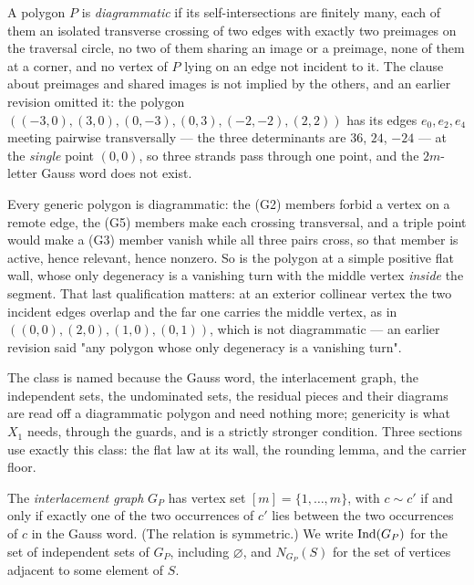 \begin{definition}\label{def:diagrammatic}
A polygon $P$ is \emph{diagrammatic} if its self-intersections are finitely
many, each of them an isolated transverse crossing of two edges with exactly two
preimages on the traversal circle, no two of them sharing an image or a
preimage, none of them at a corner, and no vertex of $P$ lying on an edge not
incident to it. The clause about preimages and shared images is not implied by
the others, and an earlier revision omitted it: the polygon
$((-3,0),(3,0),(0,-3),(0,3),(-2,-2),(2,2))$ has its edges $e_0,e_2,e_4$ meeting
pairwise transversally --- the three determinants are $36$, $24$, $-24$ --- at
the \emph{single} point $(0,0)$, so three strands pass through one point, and the
$2m$-letter Gauss word does not exist.

Every generic polygon is diagrammatic: the (G2) members forbid a vertex on a
remote edge, the (G5) members make each crossing transversal, and a triple point
would make a (G3) member vanish while all three pairs cross, so that member is
active, hence relevant, hence nonzero. So is the polygon at a simple positive
flat wall, whose only degeneracy is a vanishing turn with the middle vertex
\emph{inside} the segment. That last qualification matters: at an exterior
collinear vertex the two incident edges overlap and the far one carries the
middle vertex, as in $((0,0),(2,0),(1,0),(0,1))$, which is not diagrammatic ---
an earlier revision said "any polygon whose only degeneracy is a vanishing
turn".

The class is named because the Gauss word, the interlacement graph, the
independent sets, the undominated sets, the residual pieces and their diagrams
are read off a diagrammatic polygon and need nothing more; genericity is what
$X_1$ needs, through the guards, and is a strictly stronger condition. Three
sections use exactly this class: the flat law at its wall, the rounding lemma,
and the carrier floor.
\end{definition}

\begin{definition}\label{def:interlace}
The \emph{interlacement graph} $G_P$ has vertex set $[m]=\{1,\dots,m\}$, with
$c\sim c'$ if and only if exactly one of the two occurrences of $c'$ lies between
the two occurrences of $c$ in the Gauss word. (The relation is symmetric.) We
write $\operatorname{Ind}(G_P)$ for the set of independent sets of $G_P$, including
$\varnothing$, and $N_{G_P}(S)$ for the set of vertices adjacent to some element
of $S$.
\end{definition}

